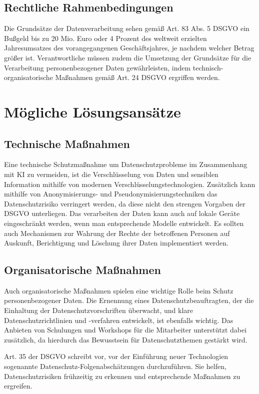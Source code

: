 \cite{keyed2024}

\subsection{Rechtliche Rahmenbedingungen}



Die Grundsätze der Datenverarbeitung sehen gemäß Art. 83 Abs. 5 DSGVO ein
Bußgeld bis zu 20 Mio. Euro oder 4 Prozent des weltweit erzielten Jahresumsatzes
des vorangegangenen Geschäftsjahres, je nachdem welcher Betrag größer ist.
Verantwortliche müssen zudem die Umsetzung der Grundsätze für die Verarbeitung
personenbezogener Daten gewährleisten, indem technisch-organisatorische
Maßnahmen gemäß Art. 24 DSGVO ergriffen werden.
\cite{keyed2024}

\section{Mögliche Lösungsansätze}

\subsection{Technische Maßnahmen}

Eine technische Schutzmaßnahme um Datenschutzprobleme im Zusammenhang mit KI zu
vermeiden, ist die Verschlüsselung von Daten und sensiblen Information mithilfe
von modernen Verschlüsselungstechnologien. Zusätzlich kann mithilfe von
Anonymisierungs- und Pseudonymisierungstechniken das Datenschutzrisiko
verringert werden, da diese nicht den strengen Vorgaben der DSGVO unterliegen.
Das verarbeiten der Daten kann auch auf lokale Geräte eingeschränkt werden, wenn
man entsprechende Modelle entwickelt. Es sollten auch Mechanismen zur Wahrung
der Rechte der betroffenen Personen auf Auskunft, Berichtigung und Löschung
ihrer Daten implementiert werden.

\cite{conrad_2017}
\cite{mindverse2024}

\subsection{Organisatorische Maßnahmen}

Auch organisatorische Maßnahmen spielen eine wichtige Rolle beim Schutz
personenbezogener Daten. Die Ernennung eines Datenschutzbeauftragten, der die
Einhaltung der Datenschutzvorschriften überwacht, und klare
Datenschutzrichtlinien und -verfahren entwickelt, ist ebenfalls wichtig. Das
Anbieten von Schulungen und Workshops für die Mitarbeiter unterstützt dabei
zusätzlich, da hierdurch das Bewusstsein für Datenschutzthemen gestärkt wird.

Art. 35 der DSGVO schreibt vor, vor der Einführung neuer Technologien sogenannte
Datenschutz-Folgenabschätzungen durchzuführen. Sie helfen, Datenschutzrisiken
frühzeitig zu erkennen und entsprechende Maßnahmen zu ergreifen.

\cite{conrad_2017}